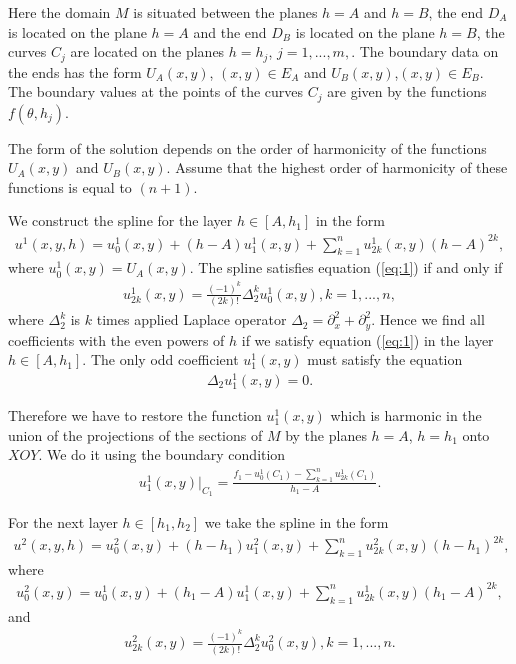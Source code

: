 \documentclass{amsart}
\begin{document}
Here the domain $M$ is situated between the planes $h=A$ and $h=B$,
the end $D_A$ is located on the plane $h=A$ and the end $D_B$ is
located on the plane $h=B$, the curves $C_j$ are located on the
planes $h=h_j$, $j=1,...,m,$. The boundary data on the ends has the
form $U_A(x,y)$, $(x,y) \in E_A$ and $U_B(x,y)$,$(x,y) \in E_B$. The
boundary values at the points of the curves $C_j$ are given by the
functions  $f(\theta,h_j)$.

The form of the solution depends on the order of harmonicity of the
functions $U_A(x,y)$ and $U_B(x,y)$. Assume that the highest order
of harmonicity of these functions is equal to $(n+1)$.

We construct the spline for the layer $h \in [A,h_1]$ in the form
\begin{eqnarray}
u^1(x,y,h)=u^1_0(x,y)+(h-A) u^1_1(x,y) + \sum_{k=1}^n u_{2
k}^1(x,y)\nonumber (h-A)^{2 k},
\end{eqnarray}
where $u^1_0(x,y)=U_A(x,y)$. The spline satisfies equation
(\ref{eq:1}) if and only if
\begin{eqnarray}
u_{2 k}^1(x,y)=\frac{(-1)^k}{(2 k)!} \Delta_2^{k}u^1_0(x,y),
k=1,...,n,\nonumber
\end{eqnarray}
where $\Delta_2^{k}$ is $k$ times applied Laplace operator
$\Delta_2=\partial^2_x+\partial^2_y$. Hence we find all coefficients
with the even powers of $h$ if we satisfy equation (\ref{eq:1}) in
the layer $h \in [A,h_1]$. The only odd coefficient $u^1_1(x,y)$
must satisfy the equation
\begin{eqnarray}
\Delta_2 u^1_1(x,y)=0.\nonumber
\end{eqnarray}

Therefore we have to restore the function $u^1_1(x,y)$ which is
harmonic in the union of the projections of the sections of $M$ by
the planes $h=A$, $h=h_1$ onto $XOY$. We do it using the boundary
condition
\begin{eqnarray}
u^1_1(x,y)|_{C_1}=\frac{f_1-u^1_0(C_1)-\sum_{k=1}^n u_{2
k}^1(C_1)}{h_1-A}.\nonumber
\end{eqnarray}

For the next layer $h \in [h_1,h_2]$ we take the spline in the form
\begin{eqnarray}
u^2(x,y,h)=u^2_0(x,y)+(h-h_1) u^2_1(x,y) + \sum_{k=1}^n u_{2
k}^2(x,y) (h-h_1)^{2 k},\nonumber
\end{eqnarray}
where
\begin{eqnarray}
u^2_0(x,y)=u^1_0(x,y)+(h_1-A) u^1_1(x,y) + \sum_{k=1}^n u_{2
k}^1(x,y) (h_1-A)^{2 k},\nonumber
\end{eqnarray}
and
\begin{eqnarray}
u_{2 k}^2(x,y)=\frac{(-1)^k}{(2 k)!} \Delta_2^{k}u^2_0(x,y),
k=1,...,n.\nonumber
\end{eqnarray}
\end{document}
